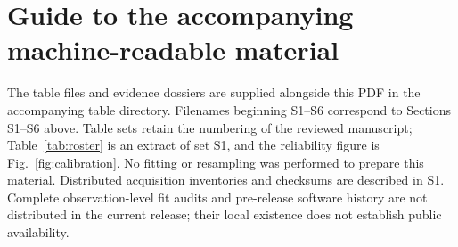 \documentclass[final,5p,authoryear,nopreprintline]{elsarticle}
\begin{document}
\section*{Guide to the accompanying machine-readable material}
The table files and evidence dossiers are supplied alongside this PDF in the accompanying table directory. Filenames beginning S1--S6 correspond to Sections S1--S6 above. Table sets retain the numbering of the reviewed manuscript; Table~\ref{tab:roster} is an extract of set S1, and the reliability figure is Fig.~\ref{fig:calibration}. No fitting or resampling was performed to prepare this material. Distributed acquisition inventories and checksums are described in S1. Complete observation-level fit audits and pre-release software history are not distributed in the current release; their local existence does not establish public availability.
\end{document}
